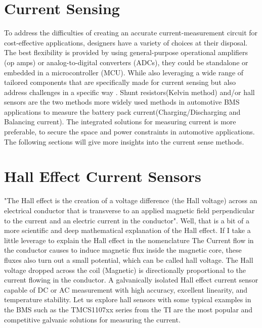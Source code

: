 \section{Current Sensing}
To address the difficulties of creating an accurate current-measurement circuit for cost-effective applications, designers have a variety of choices at their disposal. The best flexibility is provided by using general-purpose operational amplifiers (op amps) or analog-to-digital converters (ADCs), they could be standalone or embedded in a microcontroller (MCU). While also leveraging a wide range of tailored components that are specifically made for current sensing but also address challenges in a specific way \cite{TI_Current_Sensing}.
Shunt resistors(Kelvin method) and/or hall sensors are the two methods more widely used methods in automotive BMS applications to measure the battery pack current(Charging/Discharging and Balancing current). The integrated solutions for measuring current is more preferable, to secure the space and power constraints in automotive applications. The following sections will give more insights into the current sense methods.

\section{Hall Effect Current Sensors }
"The Hall effect is the creation of a voltage difference (the Hall voltage) across an electrical conductor that is transverse to an applied magnetic field perpendicular to the current and an electric current in the conductor". Well, that is a bit of a more scientific and deep mathematical explanation of the Hall effect. If I take a little leverage to explain the Hall effect in the nomenclature The Current flow in the conductor causes to induce magnetic flux inside the magnetic core, these fluxes also turn out a small potential, which can be called hall voltage. The Hall voltage dropped across the coil (Magnetic) is directionally proportional to the current flowing in the conductor.
A galvanically isolated Hall effect current sensor capable of DC or AC measurement with high accuracy, excellent linearity, and temperature stability\cite{TI_Hall_Current_Sensing_TMCS1107}.
Let us explore hall sensors with some typical examples in the BMS such as the TMCS1107xx \cite{TI_Hall_Current_Sensing_TMCS1107} series from the TI are the most popular and competitive galvanic solutions for measuring the current.


